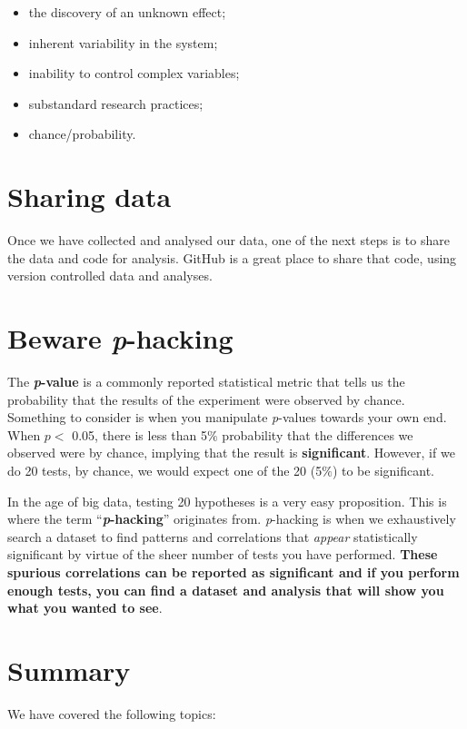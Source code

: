 \documentclass[10pt,a4paper,twoside]{article}\usepackage[]{graphicx}\usepackage[]{xcolor}
\begin{document}
\begin{itemize}
  \item the discovery of an unknown effect;
  \item inherent variability in the system;
  \item inability to control complex variables;
  \item substandard research practices;
  \item chance/probability.
\end{itemize}

\section{Sharing data}

Once we have collected and analysed our data, one of the next steps is to share the data and code for analysis. GitHub is a great place to share that code, using version controlled data and analyses.

\section{Beware \emph{p}-hacking}

The \textbf{\emph{p}-value} is a commonly reported statistical metric that tells us the probability that the results of the experiment were observed by chance. Something to consider is when you manipulate \emph{p}-values towards your own end. When $p <$ 0.05, there is less than 5$\%$ probability that the differences we observed were by chance, implying that the result is \textbf{significant}. However, if we do 20 tests, by chance, we would expect one of the 20 (5$\%$) to be significant.

In the age of big data, testing 20 hypotheses is a very easy proposition. This is where the term ``\textbf{\emph{p}-hacking}'' originates from. \emph{p}-hacking is when we exhaustively search a dataset to find patterns and correlations that \emph{appear} statistically significant by virtue of the sheer number of tests you have performed. \textbf{These spurious correlations can be reported as significant and if you perform enough tests, you can find a dataset and analysis that will show you what you wanted to see}.

\section{Summary}

We have covered the following topics:
\end{document}
